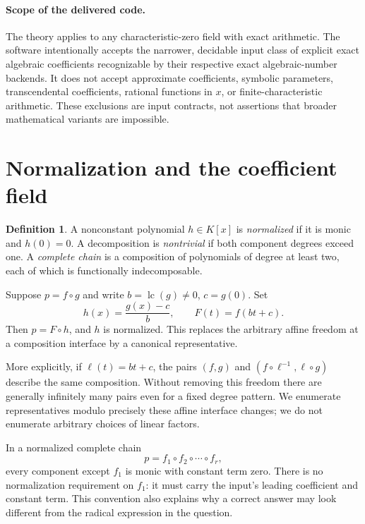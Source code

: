 \documentclass[11pt,a4paper]{article}
\numberwithin{equation}{section}
\theoremstyle{definition}
\newtheorem{definition}[theorem]{Definition}
\theoremstyle{remark}
\newcommand{\lc}{\operatorname{lc}}
\begin{document}
\paragraph{Scope of the delivered code.}
The theory applies to any characteristic-zero field with exact arithmetic.
The software intentionally accepts the narrower, decidable input class of
explicit exact algebraic coefficients recognizable by their respective
exact algebraic-number backends. It does not accept approximate coefficients, symbolic
parameters, transcendental coefficients, rational functions in $x$, or
finite-characteristic arithmetic. These exclusions are input contracts,
not assertions that broader mathematical variants are impossible.

\section{Normalization and the coefficient field}
\label{sec:normalization}
\begin{definition}
A nonconstant polynomial $h\in K[x]$ is \emph{normalized} if it is monic and
$h(0)=0$. A decomposition is \emph{nontrivial} if both component degrees exceed
one. A \emph{complete chain} is a composition of polynomials of degree at
least two, each of which is functionally indecomposable.
\end{definition}

Suppose $p=f\circ g$ and write $b=\lc(g)\ne0$, $c=g(0)$. Set
\begin{equation}
 h(x)=\frac{g(x)-c}{b},\qquad F(t)=f(bt+c).
 \label{eq:normalize}
\end{equation}
Then $p=F\circ h$, and $h$ is normalized. This replaces the arbitrary affine
freedom at a composition interface by a canonical representative.

More explicitly, if $\ell(t)=bt+c$, the pairs
$(f,g)$ and $(f\circ\ell^{-1},\ell\circ g)$ describe the same composition.
Without removing this freedom there are generally infinitely many pairs even
for a fixed degree pattern. We enumerate representatives modulo precisely
these affine interface changes; we do not enumerate arbitrary choices of
linear factors.

In a normalized complete chain
\begin{equation}
 p=f_1\circ f_2\circ\cdots\circ f_r,
 \label{eq:chain}
\end{equation}
every component except $f_1$ is monic with constant term zero. There is no
normalization requirement on $f_1$: it must carry the input's leading
coefficient and constant term. This convention also explains why a correct
answer may look different from the radical expression in the question.
\end{document}
